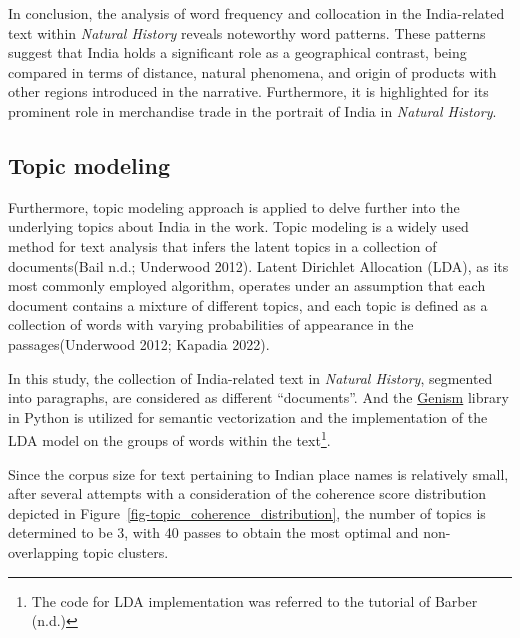 \documentclass[
  12pt,
]{article}
\begin{document}
In conclusion, the analysis of word frequency and collocation in the
India-related text within \emph{Natural History} reveals noteworthy word
patterns. These patterns suggest that India holds a significant role as
a geographical contrast, being compared in terms of distance, natural
phenomena, and origin of products with other regions introduced in the
narrative. Furthermore, it is highlighted for its prominent role in
merchandise trade in the portrait of India in \emph{Natural History}.

\hypertarget{topic-modeling}{%
\subsection{Topic modeling}\label{topic-modeling}}

Furthermore, topic modeling approach is applied to delve further into
the underlying topics about India in the work. Topic modeling is a
widely used method for text analysis that infers the latent topics in a
collection of documents(Bail n.d.; Underwood 2012). Latent Dirichlet
Allocation (LDA), as its most commonly employed algorithm, operates
under an assumption that each document contains a mixture of different
topics, and each topic is defined as a collection of words with varying
probabilities of appearance in the passages(Underwood 2012; Kapadia
2022).

In this study, the collection of India-related text in \emph{Natural
History}, segmented into paragraphs, are considered as different
``documents''. And the \href{https://radimrehurek.com/gensim/}{Genism}
library in Python is utilized for semantic vectorization and the
implementation of the LDA model on the groups of words within the
text\footnote{The code for LDA implementation was referred to the
  tutorial of Barber (n.d.)}.

Since the corpus size for text pertaining to Indian place names is
relatively small, after several attempts with a consideration of the
coherence score distribution depicted in
Figure~\ref{fig-topic_coherence_distribution}, the number of topics is
determined to be 3, with 40 passes to obtain the most optimal and
non-overlapping topic clusters.
\end{document}
